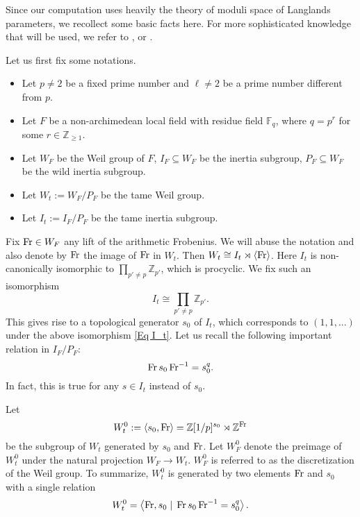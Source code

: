 	Since our computation uses heavily the theory of moduli space of Langlands parameters, we recollect some basic facts here. For more sophisticated knowledge that will be used, we refer to \cite[Section 3 and Section 4]{dat2022ihes}, or \cite[Section 2 and Section 4]{dhkm2020moduli}. 
	
	Let us first fix some notations.
	\begin{itemize}
		\item Let $p \neq 2$ be a fixed prime number and $\ell \neq 2$ be a prime number different from $p$. 
		\item Let $F$ be a non-archimedean local field with residue field $\mathbb{F}_q$, where $q=p^r$ for some $r \in \mathbb{Z}_{\geq 1}$.
		\item Let $W_F$ be the Weil group of $F$, $I_F \subseteq W_F$ be the inertia subgroup, $P_F \subseteq W_F$ be the wild inertia subgroup.
		\item Let $W_t:=W_F/P_F$ be the tame Weil group.
		\item Let $I_t:=I_F/P_F$ be the tame inertia subgroup.
	\end{itemize}
	     Fix $\operatorname{Fr} \in W_F$ any lift of the arithmetic Frobenius. We will abuse the notation and also denote by $\operatorname{Fr}$ the image of $\operatorname{Fr}$ in $W_t$. Then $W_t \cong I_t \rtimes \left<\operatorname{Fr}\right>$. Here $I_t$ is non-canonically isomorphic to $\prod_{p'\neq p}\mathbb{Z}_{p'}$, which is procyclic. We fix such an isomorphism
	     \begin{equation}\label{Eq I_t}
	     	I_t \cong \prod_{p'\neq p}\mathbb{Z}_{p'}.
	     \end{equation}
    This gives rise to a topological generator $s_0$ of $I_t$, which corresponds to $(1, 1, ...)$ under the above isomorphism \eqref{Eq I_t}. Let us recall the following important relation in $I_F/P_F$:
	\begin{equation}\label{Eq Fr s_0}
		\operatorname{Fr} s_0 \operatorname{Fr}^{-1}=s_0^q.
	\end{equation}
	In fact, this is true for any $s \in I_t$ instead of $s_0$.
	
	Let 
	$$W_t^0:=\left<s_0, \operatorname{Fr}\right>=\mathbb{Z}[1/p]^{s_0} \rtimes \mathbb{Z}^{\operatorname{Fr}}$$ 
	be the subgroup of $W_t$ generated by $s_0$ and $\operatorname{Fr}$. Let $W_F^0$ denote the preimage of $W_t^0$ under the natural projection $W_F \to W_t$. $W_F^0$ is referred to as the discretization of the Weil group. To summarize, $W_t^0$ is generated by two elements $\operatorname{Fr}$ and $s_0$ with a single relation 
	\begin{equation}\label{Equation presentation of the tame Weil group}
		W_t^0=\left<\operatorname{Fr}, s_0\;|\;\operatorname{Fr} s_0 \operatorname{Fr}^{-1}=s_0^q\right>.
	\end{equation} 
	

